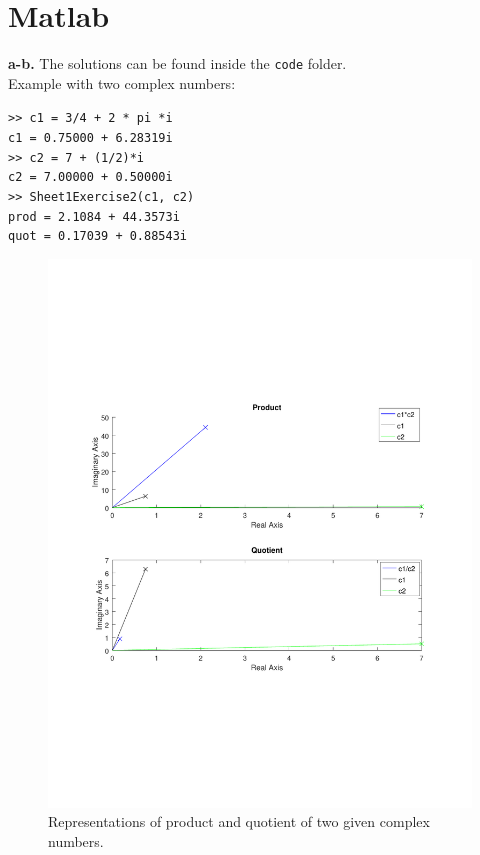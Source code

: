 \documentclass[12pt]{article}
\begin{document}
	\section{Matlab}
	\textbf{a-b.} The solutions can be found inside the \texttt{code} folder.\\
	Example with two complex numbers:
	\begin{flushleft}
		\texttt{>> c1 = 3/4 + 2 * pi *i}\\
		\texttt{c1 = 0.75000 + 6.28319i}\\
		\texttt{>> c2 = 7 + (1/2)*i}\\
		\texttt{c2 = 7.00000 + 0.50000i}\\
		\texttt{>> Sheet1Exercise2(c1, c2)}\\
		\texttt{prod = 2.1084 + 44.3573i}\\
		\texttt{quot = 0.17039 + 0.88543i}
	\end{flushleft}
	\begin{figure}[H]
	\includegraphics[width=\textwidth]{plot}
	\caption{Representations of product and quotient of two given complex numbers.}
	\end{figure}
\end{document}

